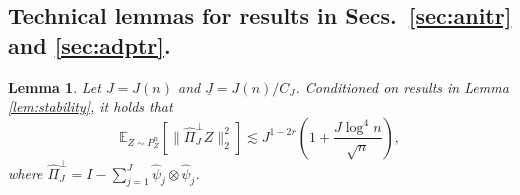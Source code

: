 \documentclass[11pt,a4paper]{article}
\renewcommand{\hat}{\widehat}
\theoremstyle{definition}
\theoremstyle{plain}
\newtheorem{lemma}{Lemma}[section]
\theoremstyle{remark}
\newcommand{\und}{\underline}
\begin{document}
\subsection{Technical lemmas for results in Secs.~\ref{sec:anitr} and \ref{sec:adptr}.}


\begin{lemma}
Let $J=J(n)$ and $\und J=J(n)/C_J$.
Conditioned on results in Lemma \ref{lem:stability}, it holds that
$$
\mathbb E_{Z\sim P_Z^n}[\|\hat\Pi_J^\perp Z\|_2^2] \lesssim J^{1-2r}\left(1+\frac{J\log^4 n}{\sqrt{n}}\right),
$$
where $\hat\Pi_{J}^\perp = I-\sum_{j=1}^{J}\hat\psi_j\otimes\hat\psi_j$.
\label{lem:truncation}
\end{lemma}
\end{document}
